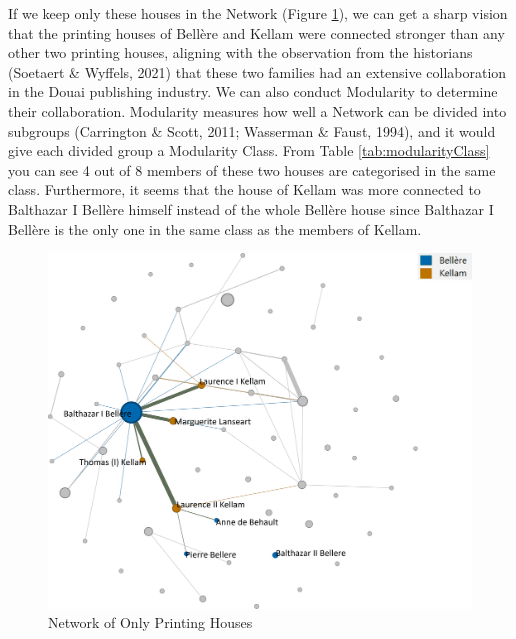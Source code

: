 \documentclass[12pt,a4paper,oneside]{book}
\begin{document}
\begin{sloppypar}
If we keep only these houses in the Network (Figure \ref{fig:printHouse}), we can get a sharp vision that the printing houses of Bellère and Kellam were connected stronger than any other two printing houses, aligning with the observation from the historians (Soetaert \& Wyffels, 2021) that these two families had an extensive collaboration in the Douai publishing industry. We can also conduct Modularity to determine their collaboration. Modularity measures how well a Network can be divided into subgroups (Carrington \& Scott, 2011; Wasserman \& Faust, 1994), and it would give each divided group a Modularity Class. From Table \ref{tab:modularityClass} you can see 4 out of 8 members of these two houses are categorised in the same class. Furthermore, it seems that the house of Kellam was more connected to Balthazar I Bellère himself instead of the whole Bellère house since Balthazar I Bellère is the only one in the same class as the members of Kellam.

\begin{figure}[H]
\centering
\includegraphics[scale=0.55]{graph/Network of Only Printing Houses.png}
\caption{Network of Only Printing Houses}
\label{fig:printHouse}
\end{figure}


\end{sloppypar}
\end{document}
